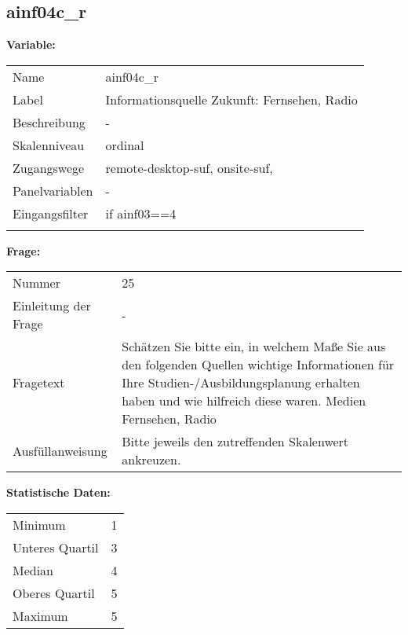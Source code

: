 	
	
	\subsection{ainf04c\_r}
	\label{subSection:ainf04c_r}

	\noindent\textbf{Variable:}\\
		\begin{tabular}{lL{11.3cm}}
			\label{tableVariable:ainf04c_r}
			Name & ainf04c\_r \\
			Label & Informationsquelle Zukunft: Fernsehen, Radio \\
			Beschreibung & - \\
			Skalenniveau & ordinal \\
			Zugangswege &
				remote-desktop-suf,
				onsite-suf,
 \\
			Panelvariablen & -
			 \\
			Eingangsfilter & if ainf03==4 \\
 \\
		\end{tabular}

		\vspace*{1 cm}
		\noindent\textbf{Frage:}\\
		\begin{tabular}{lL{11.3cm}}
			\label{tableQuestion:ainf04c_r}
			Nummer & 25 \\
			Einleitung der Frage & - \\
			Fragetext & Schätzen Sie bitte ein, in welchem Maße Sie aus den folgenden Quellen wichtige Informationen für Ihre Studien-/Ausbildungsplanung erhalten haben und wie hilfreich diese waren.
Medien
Fernsehen, Radio \\
			Ausfüllanweisung & Bitte jeweils den zutreffenden Skalenwert ankreuzen. \\
		\end{tabular}


		\vspace*{1 cm}
		\noindent\textbf{Statistische Daten:}\\
			\begin{tabular}{ll}
				\label{tableStatistics:ainf04c_r}
					Minimum & 1 \\
					Unteres Quartil & 3 \\
					Median & 4 \\
					Oberes Quartil & 5 \\
					Maximum & 5 \\
			\end{tabular}



